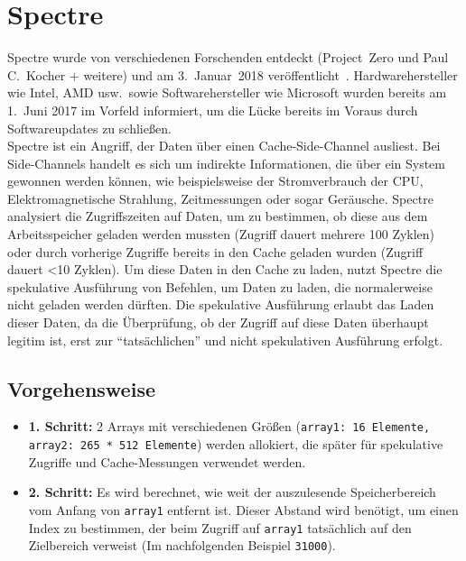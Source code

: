\section{Spectre}
\label{sec:spectre}

Spectre wurde von verschiedenen Forschenden entdeckt (Project~Zero und Paul C.~Kocher + weitere) und am 3.~Januar~2018 veröffentlicht~\cite{kocher2018spectre}.
Hardwarehersteller wie Intel, AMD usw.~sowie Softwarehersteller wie Microsoft wurden bereits am 1.~Juni 2017 im Vorfeld informiert, um die Lücke bereits im Voraus durch Softwareupdates zu schließen. \\
Spectre ist ein Angriff, der Daten über einen Cache-Side-Channel ausliest.
Bei Side-Channels handelt es sich um indirekte Informationen, die über ein System gewonnen werden können, wie beispielsweise der Stromverbrauch der CPU, Elektromagnetische Strahlung, Zeitmessungen oder sogar Geräusche.
Spectre analysiert die Zugriffszeiten auf Daten, um zu bestimmen, ob diese aus dem Arbeitsspeicher geladen werden mussten (Zugriff dauert mehrere 100 Zyklen) oder durch vorherige Zugriffe bereits in den Cache geladen wurden (Zugriff dauert <10 Zyklen).
Um diese Daten in den Cache zu laden, nutzt Spectre die spekulative Ausführung von Befehlen, um Daten zu laden, die normalerweise nicht geladen werden dürften.
Die spekulative Ausführung erlaubt das Laden dieser Daten, da die Überprüfung, ob der Zugriff auf diese Daten überhaupt legitim ist, erst zur \enquote{tatsächlichen} und nicht spekulativen Ausführung erfolgt.

\subsection{Vorgehensweise \cite{kocher2018spectre}}
\label{subsec:vorgehensweise}
\begin{itemize}
	\item \textbf{1. Schritt:} 2 Arrays mit verschiedenen Größen (\texttt{array1: 16 Elemente, array2: 265 * 512 Elemente}) werden allokiert, die später für spekulative Zugriffe und Cache-Messungen verwendet werden.
	\item \textbf{2. Schritt:} Es wird berechnet, wie weit der auszulesende Speicherbereich vom Anfang von \texttt{array1} entfernt ist.
	      Dieser Abstand wird benötigt, um einen Index zu bestimmen, der beim Zugriff auf \texttt{array1} tatsächlich auf den Zielbereich verweist (Im nachfolgenden Beispiel \texttt{31000}).
\end{itemize}

